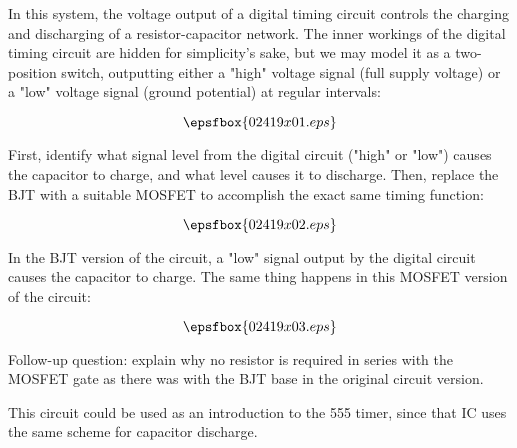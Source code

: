 

In this system, the voltage output of a digital timing circuit controls the charging and discharging of a resistor-capacitor network.  The inner workings of the digital timing circuit are hidden for simplicity's sake, but we may model it as a two-position switch, outputting either a "high" voltage signal (full supply voltage) or a "low" voltage signal (ground potential) at regular intervals:

$$\epsfbox{02419x01.eps}$$

First, identify what signal level from the digital circuit ("high" or "low") causes the capacitor to charge, and what level causes it to discharge.  Then, replace the BJT with a suitable MOSFET to accomplish the exact same timing function:

$$\epsfbox{02419x02.eps}$$







In the BJT version of the circuit, a "low" signal output by the digital circuit causes the capacitor to charge.  The same thing happens in this MOSFET version of the circuit:

$$\epsfbox{02419x03.eps}$$

\vskip 10pt

Follow-up question: explain why no resistor is required in series with the MOSFET gate as there was with the BJT base in the original circuit version.







This circuit could be used as an introduction to the 555 timer, since that IC uses the same scheme for capacitor discharge.




